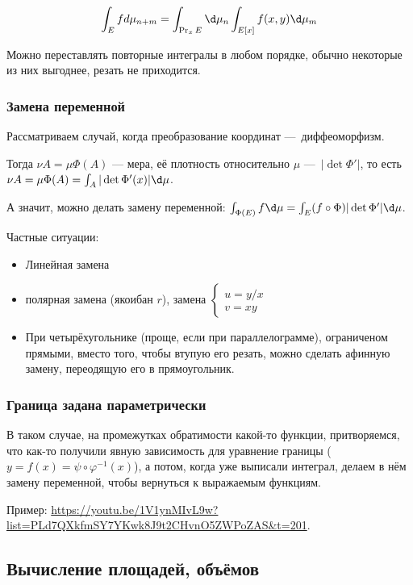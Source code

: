 \documentclass[12pt, a4paper]{article}
\begin{document}
\begin{equation}
  \int_{E} f d \mu_{n + m} = \int_{\Pr_x E} \d \mu_{n} \int_{E[x]} f(x, y) \d \mu_{m}
\end{equation}

Можно переставлять повторные интегралы в любом порядке,
обычно некоторые из них выгоднее, резать не приходится.


\subsubsection{Замена переменной}

Рассматриваем случай, когда преобразование координат — диффеоморфизм.

Тогда $\nu A = \mu \Phi (A)$ — мера, её плотность относительно $\mu$ — $|\det \Phi'|$, то есть $\nu A = \mu \Phi (A) = \int_A |\det \Phi'(x)| \d \mu$.

А значит, можно делать замену переменной: $\int_{\Phi(E)} f \d \mu = \int_E (f \circ \Phi) |\det \Phi'| \d \mu$.

Частные ситуации:
\begin{itemize}
  \item Линейная замена
  \item полярная замена (якоибан $r$), замена $\begin{cases}
    u = y/x \\
    v = xy
  \end{cases}$
  \item При четырёхугольнике (проще, если при параллелограмме), ограниченом прямыми,
  вместо того, чтобы втупую его резать, можно сделать афинную замену,
  переодящую его в прямоугольник.
\end{itemize}

\subsubsection{Граница задана параметрически}

В таком случае, на промежутках обратимости какой-то функции, притворяемся,
что как-то получили явную зависимость для уравнение границы ($y = f(x) = \psi \circ \varphi^{-1}(x)$),
а потом, когда уже выписали интеграл, делаем в нём замену переменной, чтобы вернуться к выражаемым функциям.

Пример: \url{https://youtu.be/1V1ynMIvL9w?list=PLd7QXkfmSY7YKwk8J9t2CHvnO5ZWPoZAS&t=201}.



\subsection{Вычисление площадей, объёмов}
\end{document}

